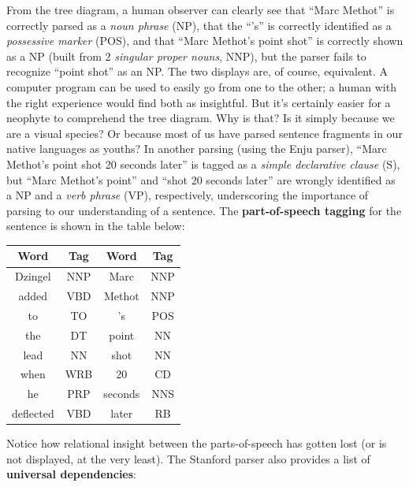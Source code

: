 From the tree diagram, a human observer can clearly see that ``Marc Methot'' is correctly parsed as a \textit{noun phrase} (NP), that the ``'s'' is correctly identified as a \textit{possessive marker} (POS), and that ``Marc Methot's point shot'' is correctly shown as a NP (built from 2 \textit{singular proper nouns}, NNP), but the parser fails to recognize  ``point shot'' as an NP. The two displays are, of course, equivalent. A computer program can be used to easily go from one to the other; a human with the right experience would find both as insightful. But it's certainly easier for a neophyte to comprehend the tree diagram. Why is that? Is it simply because we are a visual species? Or because most of us have parsed sentence fragments in our native languages as youths? In another parsing (using the Enju parser), ``Marc Methot's point shot 20 seconds later'' is tagged as a \textit{simple declarative clause} (S), but ``Marc Methot's point'' and ``shot 20 seconds later'' are wrongly identified as a NP and a \textit{verb phrase} (VP), respectively, underscoring the importance of parsing to our understanding of a sentence.  
\newl The \textbf{part-of-speech tagging} for the sentence is shown in the table below: 
\begin{center}\begin{tabular}{cc|cc} \hline
\textbf{Word} & \textbf{Tag} & \textbf{Word} & \textbf{Tag} \\ \hline
Dzingel & NNP &  Marc & NNP\\
added & VBD & Methot & NNP \\
to & TO & 's & POS \\ 
the & DT & point & NN \\ lead & NN & shot & NN\\ when & WRB & 20 & CD \\ he & PRP & seconds & NNS \\ deflected & VBD  & later & RB \\ \hline \end{tabular}\end{center} Notice how relational insight between the parts-of-speech has gotten lost (or is not displayed, at the very least).\newl 
The Stanford parser also provides a list of \textbf{universal dependencies}: 

